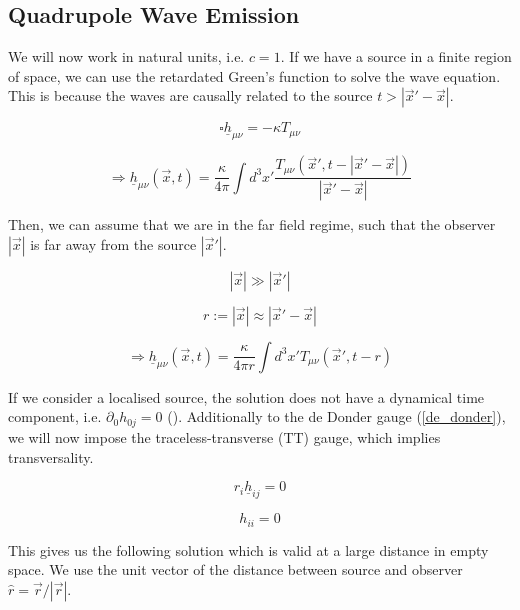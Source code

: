 \subsection{Quadrupole Wave Emission}
We will now work in natural units, i.e. $c=1$. If we have a source in a finite region of space, we can use the retardated Green's function to solve the wave equation. This is because the waves are causally related to the source $t> |\vec{x}'-\vec{x}|$.

\begin{equation}
    \square \underline{h}_{\mu\nu}=-\kappa T_{\mu\nu}
\end{equation}

\begin{equation}
    \Rightarrow \underline{h}_{\mu\nu}(\vec{x}, t) = \frac{\kappa}{4\pi} \int d^3 x' \frac{T_{\mu\nu}(\vec{x}', t-|\vec{x}'-\vec{x}|)}{|\vec{x}'-\vec{x}|}
\end{equation}

Then, we can assume that we are in the far field regime, such that the observer $|\vec{x}|$ is far away from the source $|\vec{x}'|$.

\begin{equation}
    |\vec{x}| \gg |\vec{x}'|
\end{equation}

\begin{equation}
    r:= |\vec{x}| \approx |\vec{x}'-\vec{x}|
\end{equation}

\begin{equation}
    \Rightarrow \underline{h}_{\mu\nu}(\vec{x}, t) = \frac{\kappa}{4\pi r} \int d^3 x' T_{\mu\nu}(\vec{x}', t-r)
\end{equation}

If we consider a localised source, the solution does not have a dynamical time component, i.e. $\partial_0 h_{0j} = 0$ (\cite{van_holten_gravitational_2019}).
Additionally to the de Donder gauge (\ref{de_donder}), we will now impose the traceless-transverse (TT) gauge, which implies transversality.

\begin{equation}
    r_i \underline{h}_{ij} = 0
\end{equation}

\begin{equation}
    h_{ii} = 0
\end{equation}

This gives us the following solution which is valid at a large distance in empty space. We use the unit vector of the distance between source and observer $\hat{r}=\vec{r}/|\vec{r}|$.


